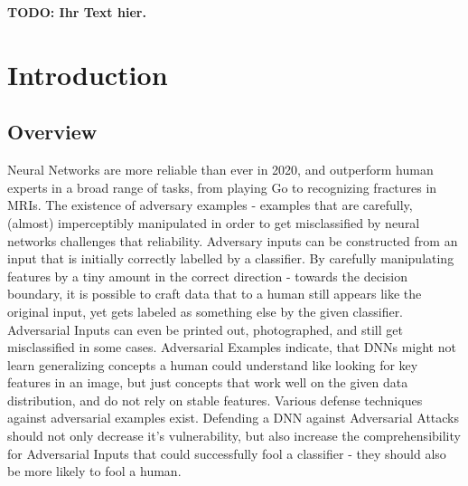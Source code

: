 \documentclass[draft,final]{vutinfth} %
\newcommand{\todo}[1]{{\color{red}\textbf{TODO: {#1}}}} %
\begin{document}
\frontmatter %

\addstatementpage

\begin{kurzfassung}
\todo{Ihr Text hier.}
\end{kurzfassung}

\begin{abstract}
\todo{Enter your text here.}
\end{abstract}


\tableofcontents %

\mainmatter

\chapter{Introduction}

\section{Overview}

Neural Networks are more reliable than ever in 2020, and outperform human experts in a broad range of tasks, from playing Go to recognizing fractures in MRIs.
The existence of adversary examples - examples that are carefully, (almost) imperceptibly manipulated in order to get misclassified by neural networks challenges that reliability.
Adversary inputs can be constructed from an input that is initially correctly labelled by a classifier.
By carefully manipulating features by a tiny amount in the correct direction - towards the decision boundary, it is possible to
craft data that to a human still appears like the original input, yet gets labeled as something else by the given classifier.
Adversarial Inputs can even be printed out, photographed, and still get misclassified in some cases.
Adversarial Examples indicate, that DNNs might not learn generalizing concepts a human could understand like looking for key features in an image, but just concepts that work well on the given data distribution, and do not rely on stable features.
Various defense techniques against adversarial examples exist.
Defending a DNN against Adversarial Attacks should not only decrease it's vulnerability, but also increase the comprehensibility for Adversarial Inputs that could successfully fool a classifier - they should also be more likely to fool a human.
\end{document}
